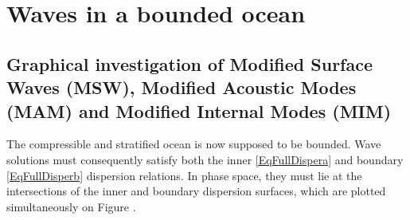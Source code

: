 \section{Waves in a bounded ocean}
\label{SectionGraphic}

\subsection{Graphical investigation of Modified Surface Waves (MSW), Modified Acoustic Modes (MAM) and Modified Internal Modes (MIM)}
\label{SubSectionPotBranches}
The compressible and stratified ocean is now supposed to be bounded. Wave solutions must consequently satisfy both the inner \ref{EqFullDispera} and boundary \ref{EqFullDisperb} dispersion relations. In phase space, they must lie at the intersections of the inner and boundary dispersion surfaces, which are plotted simultaneously on Figure .
%
